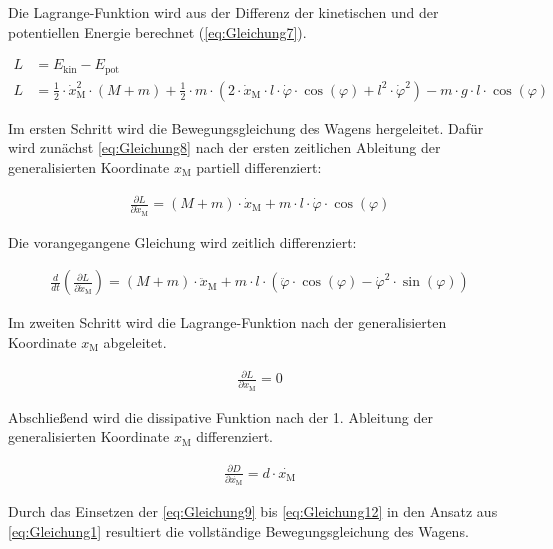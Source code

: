 \documentclass[
	pagesize,
	fontsize=12pt,
	paper=a4,
	oneside,
   reqno
]{scrartcl}
\begin{document}
Die Lagrange-Funktion wird aus der Differenz der kinetischen und der potentiellen Energie berechnet (\autoref{eq:Gleichung7}).

\begin{align} 
        L &= E_{\mathrm{kin}} - E_{\mathrm{pot}}  \label{eq:Gleichung7} \\ 
        L &= \frac{1}{2} \cdot \dot{x}_{\mathrm{M}}^2 \cdot (M + m) + \frac{1}{2} \cdot m \cdot \left( 2 \cdot \dot{x}_{\mathrm{M}} \cdot l \cdot \dot{\varphi} \cdot \cos({\varphi}) + l^2 \cdot \dot{\varphi}^2\right) - m \cdot g \cdot l \cdot \cos({\varphi}) \label{eq:Gleichung8}
\end{align}

Im ersten Schritt wird die Bewegungsgleichung des Wagens hergeleitet. Dafür wird zunächst \autoref{eq:Gleichung8} nach der ersten zeitlichen Ableitung der generalisierten Koordinate $x_{\mathrm{M}}$ partiell differenziert:

\begin{align}\label{eq:Gleichung9}
    \frac{\partial L}{\partial \dot{x}_{\mathrm{M}}} = (M + m) \cdot \dot{x}_{\mathrm{M}} + m \cdot l \cdot \dot{\varphi} \cdot \cos(\varphi)
\end{align}

Die vorangegangene Gleichung wird zeitlich differenziert:

\begin{align}\label{eq:Gleichung10}
    \frac{d}{dt}\left(\frac{\partial L}{\partial \dot{x}_{\mathrm{M}}}\right) = (M + m) \cdot \ddot{x}_{\mathrm{M}} + m \cdot l \cdot \left(\ddot{\varphi} \cdot \cos(\varphi) - \dot{\varphi}^2 \cdot \sin(\varphi) \right)
\end{align}

Im zweiten Schritt wird die Lagrange-Funktion nach der generalisierten Koordinate $x_{\mathrm{M}}$ abgeleitet.

\begin{align}\label{eq:Gleichung11}
    \frac{\partial L}{\partial x_{\mathrm{M}}} = 0
\end{align}

Abschließend wird die dissipative Funktion nach der 1. Ableitung der generalisierten Koordinate $x_{\mathrm{M}}$ differenziert.

\begin{align}\label{eq:Gleichung12}
    \frac{\partial D}{\partial \dot{x_{\mathrm{M}}}} = d \cdot \dot{x_{\mathrm{M}}}
\end{align}

Durch das Einsetzen der \autoref{eq:Gleichung9} bis \autoref{eq:Gleichung12} in den Ansatz aus \autoref{eq:Gleichung1} resultiert die vollständige Bewegungsgleichung des Wagens.
\end{document}
